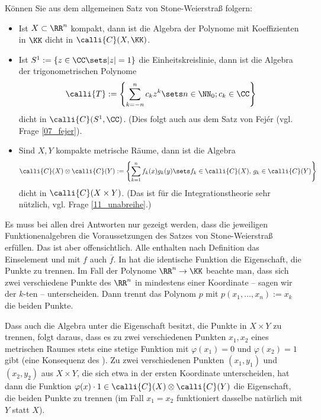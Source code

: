 \begin{frage}\label{09_stonekonsequenz}
  Können Sie aus dem allgemeinen Satz von Stone-Weierstraß folgern: 
  {\setlength{\labelsep}{4mm}
    \begin{itemize}
    \item[\desc{a}] Ist $X\subset \RR^n$ kompakt, dann ist die Algebra der 
      Polynome mit Koeffizienten in $\KK$ dicht in $\calli{C}(X,\KK)$.\\[-3.5mm]
    \item[\desc{b}] Ist $S^1 := \{ z\in \CC\sets |z|=1 \}$ die Einheitskreislinie, 
      dann ist die Algebra der trigonometrischen Polynome 
      \[
      \calli{T} := \left\{ \sum_{k=-n}^n c_k z^k \sets n\in\NN_0; c_k 
        \in \CC \right\} 
      \]
      dicht in $\calli{C}( S^1, \CC )$. (Dies folgt auch aus dem Satz 
      von Fej\'er (vgl. Frage \ref{07_fejer}).\\[-3.5mm]
    \item[\desc{c}] Sind $X,Y$ kompakte metrische Räume, dann ist die 
      Algebra
      \[
      \calli{C}(X) \otimes \calli{C}(Y) := \left\{ \sum_{k=1}^n f_k(x) g_k(y) \sets
        f_k \in \calli{C}(X), \, g_k\in \calli{C}(Y) \right\}
      \]
      dicht in $\calli{C}( X\times Y)$. (Das ist für die Integrationstheorie sehr 
      nützlich, vgl. Frage \ref{11_unabreihe}.)
    \end{itemize}}
\end{frage}

\begin{antwort}
  Es muss bei allen drei Antworten nur gezeigt werden, dass die 
  jeweiligen Funktionenalgebren die Voraussetzungen des Satzes von 
  Stone-Weierstraß erfüllen. Das ist aber offensichtlich. Alle enthalten 
  nach Definition das Einselement und mit $f$ auch $\overline{f}$. 
  In  hat die identische Funktion die Eigenschaft, 
  die Punkte zu trennen. Im Fall der Polynome $\RR^n \to \KK$ beachte man, 
  dass sich zwei verschiedene Punkte des $\RR^n$ in mindestens einer 
  Koordinate -- sagen wir der $k$-ten -- unterscheiden. 
  Dann trennt das Polynom $p$ mit $p(x_1,\ldots,x_n):=x_k$ die beiden Punkte. 

  Dass auch die Algebra unter  die Eigenschaft besitzt, die 
  Punkte in $X\times Y$ zu trennen, folgt daraus, dass es zu zwei verschiedenen 
  Punkten $x_1,x_2$ eines metrischen Raumes stets eine stetige Funktion 
  mit $\varphi(x_1)=0$ und $\varphi(x_2)=1$ gibt (eine Konsequenz des  
  ). Zu zwei verschiedenen Punkten 
  $(x_1,y_1)$ und $(x_2,y_2)$ aus $X\times Y$, die sich etwa in der 
  ersten Koordinate unterscheiden, hat dann die Funktion 
  $\varphi(x) \cdot 1 \in \calli{C}(X) \otimes \calli{C}(Y)$ 
  die Eigenschaft, die beiden Punkte zu trennen (im Fall $x_1=x_2$ 
  funktioniert dasselbe natürlich mit $Y$ statt $X$). \AntEnd
\end{antwort}





